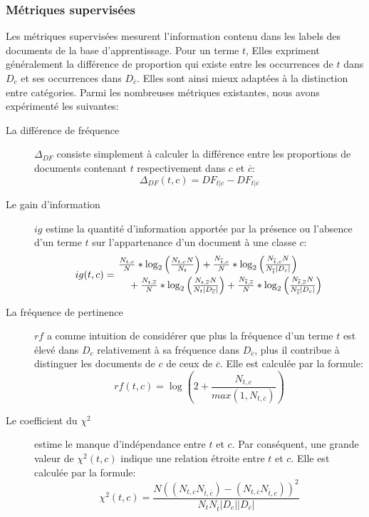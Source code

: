 \subsubsection{Métriques supervisées}
Les métriques supervisées mesurent l'information contenu dans les labels des documents de la base d'apprentissage. Pour un terme $t$, Elles expriment généralement la différence de proportion qui existe entre les occurrences de $t$ dans $D_c$ et ses occurrences dans $D_{\overline{c}}$. Elles sont ainsi mieux adaptées à la distinction entre catégories. Parmi les nombreuses métriques existantes, nous avons expérimenté les suivantes: 
\begin{description}
	\item[La différence de fréquence] $\Delta_{DF}$ consiste simplement à calculer la différence entre les proportions de documents contenant $t$ respectivement dans $c$ et $\overline{c}$:
	\[\Delta_{DF}(t,c) = DF_{t \vert c} - DF_{t \vert \overline{c}}\]
	\item[Le gain d'information] $ig$ \citep{yang1997IGandIMandCHIandTS} estime la quantité d'information apportée par la présence ou l'absence d'un terme $t$ sur l'appartenance d'un document à une classe $c$:
	\begin{equation*} %
	ig(t, c) = \splitdfrac{\frac{N_{t,c}}{N} * \log_2 \left(\frac{N_{t,c}N}{N_{t}}\right)
		 + \frac{N_{\overline{t},c}}{N} * \log_2 \left(\frac{N_{\overline{t},c}N}{N_{\overline{t}}\vert D_c \vert}\right)}
	{+ \frac{N_{t,\overline{c}}}{N} * \log_2 \left(\frac{N_{t,\overline{c}}N}{N_{t}\vert D_{\overline{c}}\vert}\right)
	+ \frac{N_{\overline{t},\overline{c}}}{N} * \log_2 \left(\frac{N_{\overline{t},\overline{c}}N}{N_{\overline{t}}\vert D_c \vert}\right)}
	\end{equation*}
	\item[La fréquence de pertinence] $rf$ \citep{lan2009rf} a comme intuition de considérer que  plus la fréquence d'un terme $t$ est élevé dans $D_c$ relativement à sa fréquence dans $D_{\overline{c}}$, plus il contribue à distinguer les documents de $c$ de ceux de $\overline{c}$. Elle est calculée par la formule:
	\[rf(t,c) = \log\left(2 + \frac{N_{t,c}}{max(1, N_{t,\overline{c}})}\right)\]
	\item[Le coefficient du $\chi^2$] \citep{schutze1995chi2} estime le manque d'indépendance entre $t$ et $c$. Par conséquent, une grande valeur de  $\chi^2(t,c)$ indique une relation étroite entre $t$ et $c$. Elle est calculée par la formule:
	\[\chi^2(t,c) = \frac{N ((N_{t,c} N_{\overline{t},\overline{c}}) - (N_{t,\overline{c}} N_{\overline{t},c}))^2}{N_t N_{\overline{t}} \vert D_c \vert  \vert D_{\overline{c}} \vert }\]

\end{description}
